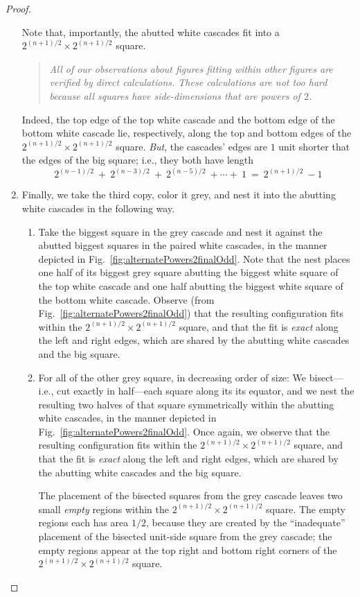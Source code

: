 \begin{proof}
\begin{enumerate}
Note that, importantly, the abutted white cascades fit into a
$2^{(n+1)/2} \times 2^{(n+1)/2}$ square.
\begin{quote}
  {\em All of our observations about figures fitting within other
  figures are verified by direct calculations.  These calculations are
  not too hard because all squares have side-dimensions that are
  powers of $2$.}
\end{quote}
Indeed, the top edge of the top white cascade and the bottom edge of
the bottom white cascade lie, respectively, along the top and bottom
edges of the $2^{(n+1)/2} \times 2^{(n+1)/2}$ square.  {\em But}, the
cascades' edges are $1$ unit shorter that the edges of the big square;
i.e., they both have length
\[
2^{(n-1)/2} \ + \ 2^{(n-3)/2} \ + \ 2^{(n-5)/2} \ + \cdots + \ 1
\ = \ 2^{(n+1)/2} \ - 1
\]

\item
Finally, we take the third copy, color it grey, and nest it into the
abutting white cascades in the following way.
  \begin{enumerate}
  \item
Take the biggest square in the grey cascade and nest it against the
abutted biggest squares in the paired white cascades, in the manner
depicted in Fig.~\ref{fig:alternatePowers2finalOdd}.  Note that the
nest places one half of its biggest grey square abutting the biggest
white square of the top white cascade and one half abutting the
biggest white square of the bottom white cascade.  Observe (from
Fig.~\ref{fig:alternatePowers2finalOdd}) that the resulting
configuration fits within the $2^{(n+1)/2} \times 2^{(n+1)/2}$ square,
and that the fit is {\em exact} along the left and right edges, which
are shared by the abutting white cascades and the big square.

  \item
For all of the other grey square, in decreasing order of size: We
bisect---i.e., cut exactly in half---each square along its its
equator, and we nest the resulting two halves of that square
symmetrically within the abutting white cascades, in the manner
depicted in Fig.~\ref{fig:alternatePowers2finalOdd}.  Once again, we
observe that the resulting configuration fits within the $2^{(n+1)/2}
\times 2^{(n+1)/2}$ square, and that the fit is {\em exact} along the
left and right edges, which are shared by the abutting white cascades
and the big square.

The placement of the bisected squares from the grey cascade leaves two
small {\em empty} regions within the $2^{(n+1)/2} \times 2^{(n+1)/2}$
square.  The empty regions each has area $1/2$, because they are
created by the ``inadequate'' placement of the bisected unit-side
square from the grey cascade; the empty regions appear at the top
right and bottom right corners of the $2^{(n+1)/2} \times 2^{(n+1)/2}$
square.
  \end{enumerate}
\end{enumerate}


\end{proof}
